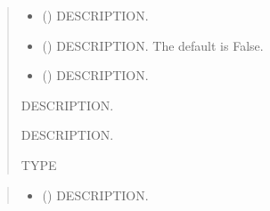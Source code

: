 \documentclass[letterpaper,10pt,english]{sphinxmanual}
\begin{document}
\begin{fulllineitems}
\begin{fulllineitems}
\begin{quote}
\begin{description}
\begin{itemize}
\item {} 
\sphinxAtStartPar
{} () \textendash{} DESCRIPTION.

\item {} 
\sphinxAtStartPar
{} (\sphinxstyleliteralemphasis{\sphinxupquote{, }}) \textendash{} DESCRIPTION. The default is False.

\item {} 
\sphinxAtStartPar
{} () \textendash{} DESCRIPTION.

\end{itemize}

\sphinxAtStartPar
{} \textendash{} DESCRIPTION.

\sphinxAtStartPar
{} \textendash{} DESCRIPTION.

\sphinxAtStartPar
TYPE

\end{description}\end{quote}

\end{fulllineitems}


\begin{fulllineitems}
\label{\detokenize{query:ggcas.query.GaiaQuery.getRV}}
\pysigstartsignatures
{}
\pysigstopsignatures\begin{quote}\begin{description}
\begin{itemize}
\item {} 
\sphinxAtStartPar
{} () \textendash{} DESCRIPTION.


\end{itemize}
\end{description}
\end{quote}
\end{fulllineitems}
\end{fulllineitems}
\end{document}
